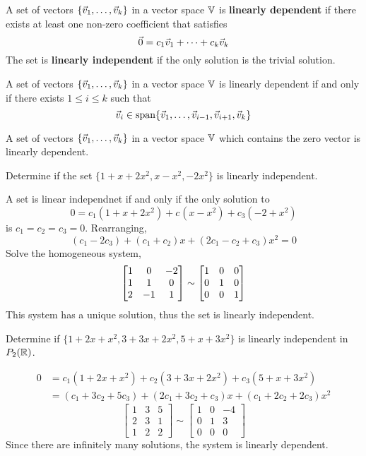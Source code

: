 \documentclass[english, 12pt]{article}
\begin{document}
\begin{defn}
A set of vectors $\{\vec{v}_1,\dots,\vec{v}_k\}$ in a vector space ${\mathbb{V}}$ is \textbf{linearly dependent} if there exists at least one non-zero coefficient that satisfies
\[\vec{0} = c_1\vec{v}_1 + \cdots + c_k\vec{v}_k\]
The set is \textbf{linearly independent} if the only solution is the trivial solution.
\end{defn}

\begin{thrm}
A set of vectors $\{\vec{v}_1,\dots,\vec{v}_k\}$ in a vector space ${\mathbb{V}}$ is linearly dependent if and only if there exists $1 \leq i \leq k$ such that
\[\vec{v}_i \in \operatorname{span} \{\vec{v}_1,\dots,\vec{v}_{i-1},\vec{v}_{i+1},\vec{v}_k\}\]
\end{thrm}

\begin{thrm}
A set of vectors $\{\vec{v}_1,\dots,\vec{v}_k\}$ in a vector space ${\mathbb{V}}$ which contains the zero vector is linearly dependent.
\end{thrm}

\begin{exmp}
Determine if the set $\{1 + x + 2x^2,x-x^2,-2x^2\}$ is linearly independent.
\begin{sol}
A set is linear independnet if and only if the only solution to
\[0 = c_{1} (1 + x + 2x^2) + c_{}(x-x^2) + c_{3} (-2 + x^2)\]
is $c_1 = c_2 = c_3 = 0$. Rearranging,
\[(c_1 - 2c_3) + (c_1 + c_2) x + (2c_1 - c_2 + c_3)x^2 = 0\]
Solve the homogeneous system,
\[\begin{bmatrix} 1 & 0 & -2 \\ 1 & 1 & 0 \\ 2 & -1 & 1 \end{bmatrix} \sim \begin{bmatrix} 1 & 0 & 0 \\ 0 & 1 & 0 \\ 0 & 0 & 1 \end{bmatrix} \]
This system has a unique solution, thus the set is linearly independent.
\end{sol}
\end{exmp}

\begin{exmp}
Determine if $\{1 + 2x + x^2,3 + 3x + 2x^2, 5 + x + 3x^2\}$ is linearly independent in $P_2({\mathbb{R}})$.
\begin{sol}
\begin{align*}
0 &= c_{1}(1 + 2x + x^2) + c_{2}(3 + 3x + 2x^2) + c_{3} (5 + x + 3x^2)\\
&= (c_{1} + 3c_{2} + 5 c_{3}) + (2c_{1} + 3c_2 + c_3) x + (c_1 + 2c_2 + 2c_3)x^2
\end{align*}
\[\begin{bmatrix} 1 & 3 & 5 \\ 2 & 3 & 1 \\ 1 & 2 & 2 \end{bmatrix} \sim \begin{bmatrix} 1 & 0 & -4 \\ 0 & 1 & 3 \\ 0 & 0 & 0 \end{bmatrix}\]
Since there are infinitely many solutions, the system is linearly dependent.
\end{sol}
\end{exmp}
\end{document}
